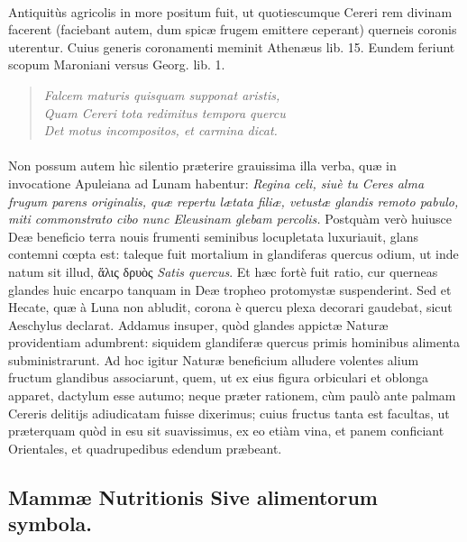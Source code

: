 \documentclass[a4paper, 11pt, oneside, polutonikogreek, latin]{article}
\begin{document}
\paragraph{}
Antiquitùs agricolis in more positum fuit, ut quotiescumque Cereri rem divinam facerent (faciebant autem, dum spicæ frugem emittere ceperant) querneis coronis uterentur. Cuius generis coronamenti meminit Athenæus lib. 15. Eundem feriunt scopum Maroniani versus Georg. lib. 1.
\begin{quote}
\emph{Falcem maturis quisquam supponat aristis,}\\
\emph{Quam Cereri tota redimitus tempora quercu}\\
\emph{Det motus incompositos, et carmina dicat.}\\
\end{quote}
\vspace*{-8mm}
\paragraph{}
Non possum autem hìc silentio præterire grauissima illa verba, quæ in invocatione Apuleiana ad Lunam habentur: \emph{Regina celi, siuè tu Ceres alma frugum parens originalis, quæ repertu lætata filiæ, vetustæ glandis remoto pabulo, miti commonstrato cibo nunc Eleusinam glebam percolis.} Postquàm verò huiusce Deæ beneficio terra nouis frumenti seminibus locupletata luxuriauit, glans contemni cœpta est: taleque fuit mortalium in glandiferas quercus odium, ut inde natum sit illud, ἅλις δρυὸς \emph{Satis quercus}. Et hæc fortè fuit ratio, cur querneas glandes huic encarpo tanquam in Deæ tropheo protomystæ suspenderint. Sed et Hecate, quæ à Luna non abludit, corona è quercu plexa decorari gaudebat, sicut Aeschylus declarat. Addamus insuper, quòd glandes appictæ Naturæ providentiam adumbrent: siquidem glandiferæ quercus primis hominibus alimenta subministrarunt. Ad hoc igitur Naturæ beneficium alludere volentes alium fructum glandibus associarunt, quem, ut ex eius figura orbiculari et oblonga apparet, dactylum esse autumo; neque præter rationem, cùm paulò ante palmam Cereris delitijs adiudicatam fuisse dixerimus; cuius fructus tanta est facultas, ut præterquam quòd in esu sit suavissimus, ex eo etiàm vina, et panem conficiant Orientales, et quadrupedibus edendum præbeant.
\clearpage
\subsection{Mammæ Nutritionis Sive alimentorum symbola.}
\end{document}
